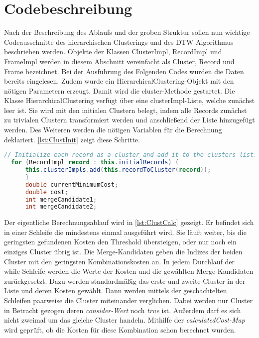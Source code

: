\section{Codebeschreibung}
\label{5-Codebeschreibung}
Nach der Beschreibung des Ablaufs und der groben Struktur
sollen nun wichtige Codeausschnitte des hierarchischen Clusterings
und des \ac{DTW}-Algorithmus beschrieben werden.
Objekte der Klassen ClusterImpl, RecordImpl und FrameImpl werden in diesem Abschnitt
vereinfacht als Cluster, Record und Frame bezeichnet.
Bei der Ausführung des Folgenden Codes wurden die Daten bereits eingelesen.
Zudem wurde ein HierarchicalClustering-Objekt mit den nötigen Parametern erzeugt.
Damit wird die cluster-Methode gestartet.
Die Klasse HierarchicalClustering verfügt über eine clusterImpl-Liste,
welche zunächst leer ist.
Sie wird mit den initialen Clustern belegt,
indem alle Records zunächst zu trivialen Clustern transformiert werden
und anschließend der Liste hinzugefügt werden.
Des Weiteren werden die nötigen Variablen für die Berechnung deklariert.
\autoref{lst:ClustInit} zeigt diese Schritte.
\begin{lstfloat}
\begin{lstlisting}[language=Java, label={lst:ClustInit}, caption=Cluster-Methode: Initialisierung.]
  // Initialize each record as a cluster and add it to the clusters list.
  for (RecordImpl record : this.initialRecords) {
      this.clusterImpls.add(this.recordToCluster(record));
      }
      double currentMinimumCost;
      double cost;
      int mergeCandidate1;
      int mergeCandidate2;
\end{lstlisting}
\end{lstfloat}
Der eigentliche Berechnungsablauf wird in \autoref{lst:ClustCalc} gezeigt.
Er befindet sich in einer Schleife die mindestens einmal ausgeführt wird.
Sie läuft weiter, bis die geringsten gefundenen Kosten den Threshold übersteigen,
oder nur noch ein einziges Cluster übrig ist.
Die Merge-Kandidaten geben die Indizes der beiden Cluster mit den
geringsten Kombinationskosten an.
In jedem Durchlauf der while-Schleife werden die Werte der Kosten
und die gewählten Merge-Kandidaten zurückgesetzt.
Dazu werden standardmäßig das erste und zweite Cluster in der Liste und deren Kosten gewählt.
Dann werden mittels der geschachtelten Schleifen paarweise die Cluster miteinander verglichen.
Dabei werden nur Cluster in Betracht gezogen deren \emph{consider-Wert} noch \emph{true} ist.
Außerdem darf es sich nicht zweimal um das gleiche Cluster handeln.
Mithilfe der \emph{calculatedCost-Map} wird geprüft, ob die Kosten für diese Kombination schon berechnet wurden.
